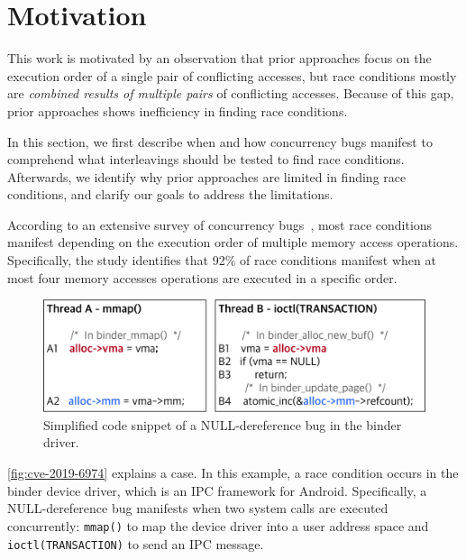 \section{Motivation}
\label{s:motivation}


This work is motivated by an observation that prior approaches
focus on the execution order of a single pair of conflicting
accesses, but race conditions mostly are \textit{combined results of multiple pairs} 
of conflicting accesses.
%
Because of this gap, prior approaches shows inefficiency in finding race
conditions.

In this section, we first describe when and how concurrency bugs
manifest to comprehend what interleavings should be tested to find
race conditions.
%
Afterwards, we identify why prior approaches are limited in finding
race conditions, and clarify our goals to address the limitations.


%
According to an extensive survey of concurrency
bugs~\cite{learningfrommistakes}, most race conditions manifest
depending on the execution order of multiple memory access operations.
%
Specifically, the study identifies that 92\% of race conditions manifest 
when at most four memory accesses operations are executed in a specific
order.
%

\begin{figure}[t]
  \centering
  \includegraphics[width=0.95\linewidth]{fig/cve-2017-10661.pdf}
  \caption{Simplified code snippet of a NULL-dereference bug in the
    binder driver.}
  \label{fig:cve-2019-6974}
\end{figure}

\autoref{fig:cve-2019-6974} explains a case. In this example, a race
condition occurs in the binder device driver, which is an IPC
framework for Android. Specifically, a NULL-dereference bug manifests
when two system calls are executed concurrently: \texttt{mmap()} to
map the device driver into a user address space and
\texttt{ioctl(TRANSACTION)} to send an IPC message.


